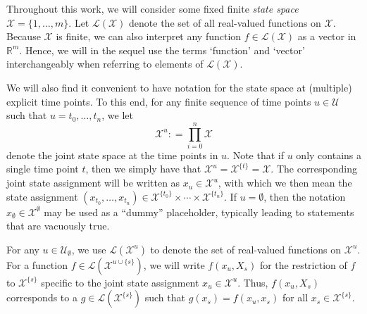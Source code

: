 \documentclass[10pt,a4paper]{paper}
\theoremstyle{definition}
\newcommand{\reals}{\mathbb{R}}
\newcommand{\states}{\mathcal{X}}
\newcommand{\gambles}{\mathcal{L}}
\newcommand{\gamblesX}{\gambles(\states)}
\newcommand{\coloneqq}{:\!=}
\begin{document}
Throughout this work, we will consider some fixed finite \emph{state space} $\states=\{1,\dots,m\}$. Let $\gamblesX$ denote the set of all real-valued functions on $\states$. Because $\states$ is finite, we can also interpret any function $f\in\gamblesX$ as a vector in $\reals^m$. Hence, we will in the sequel use the terms `function' and `vector' interchangeably when referring to elements of $\gamblesX$.

We will also find it convenient to have notation for the state space at (multiple) explicit time points. To this end, for any finite sequence of time points $u\in\mathcal{U}$ such that $u=t_0,\ldots,t_n$, we let
\begin{equation*}
\states^u \coloneqq \prod_{i=0}^n \states
\end{equation*}
denote the joint state space at the time points in $u$. Note that if $u$ only contains a single time point $t$, then we simply have that $\states^u=\states^{\{t\}}=\states$. The corresponding joint state assignment will be written as $x_u\in\states^u$, with which we then mean the state assignment $(x_{t_0},\ldots,x_{t_n})\in\states^{\{t_0\}}\times\cdots\times\states^{\{t_n\}}$. If $u=\emptyset$, then the notation $x_\emptyset\in\states^\emptyset$ may be used as a ``dummy'' placeholder, typically leading to statements that are vacuously true.

For any $u\in\mathcal{U}_\emptyset$, we use $\gambles(\states^u)$ to denote the set of real-valued functions on $\states^u$. For a function $f\in\gambles(\states^{u\cup\{s\}})$, we will write $f(x_u,X_s)$ for the restriction of $f$ to $\states^{\{s\}}$ specific to the joint state assignment $x_u\in\states^u$. Thus, $f(x_u,X_s)$ corresponds to a $g\in\gambles(\states^{\{s\}})$ such that $g(x_s) = f(x_u,x_s)$ for all $x_s\in\states^{\{s\}}$.

\end{document}
